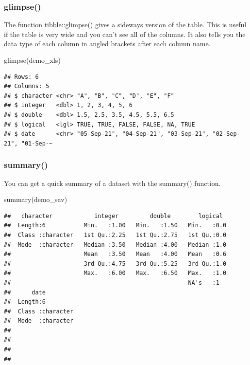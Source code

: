 \documentclass[
  oneside]{book}
\newenvironment{Shaded}{\begin{snugshade}}{\end{snugshade}}
\newcommand{\FunctionTok}[1]{\textcolor[rgb]{0.00,0.00,0.00}{#1}}
\newcommand{\NormalTok}[1]{#1}
\begin{document}
\hypertarget{glimpse}{%
\subsubsection{glimpse()}\label{glimpse}}

The function {tibble}{::}{glimpse}{(}{)} gives a sideways version of the table. This is useful if the table is very wide and you can't see all of the columns. It also tells you the data type of each column in angled brackets after each column name.

\begin{Shaded}
\begin{Highlighting}[]
\FunctionTok{glimpse}\NormalTok{(demo\_xls)}
\end{Highlighting}
\end{Shaded}

\begin{verbatim}
## Rows: 6
## Columns: 5
## $ character <chr> "A", "B", "C", "D", "E", "F"
## $ integer   <dbl> 1, 2, 3, 4, 5, 6
## $ double    <dbl> 1.5, 2.5, 3.5, 4.5, 5.5, 6.5
## $ logical   <lgl> TRUE, TRUE, FALSE, FALSE, NA, TRUE
## $ date      <chr> "05-Sep-21", "04-Sep-21", "03-Sep-21", "02-Sep-21", "01-Sep-~
\end{verbatim}

\hypertarget{summary-function}{%
\subsubsection{summary()}\label{summary-function}}

You can get a quick summary of a dataset with the {summary}{(}{)} function.

\begin{Shaded}
\begin{Highlighting}[]
\FunctionTok{summary}\NormalTok{(demo\_sav)}
\end{Highlighting}
\end{Shaded}

\begin{verbatim}
##   character            integer         double        logical   
##  Length:6           Min.   :1.00   Min.   :1.50   Min.   :0.0  
##  Class :character   1st Qu.:2.25   1st Qu.:2.75   1st Qu.:0.0  
##  Mode  :character   Median :3.50   Median :4.00   Median :1.0  
##                     Mean   :3.50   Mean   :4.00   Mean   :0.6  
##                     3rd Qu.:4.75   3rd Qu.:5.25   3rd Qu.:1.0  
##                     Max.   :6.00   Max.   :6.50   Max.   :1.0  
##                                                   NA's   :1    
##      date          
##  Length:6          
##  Class :character  
##  Mode  :character  
##                    
##                    
##                    
## 
\end{verbatim}
\end{document}
